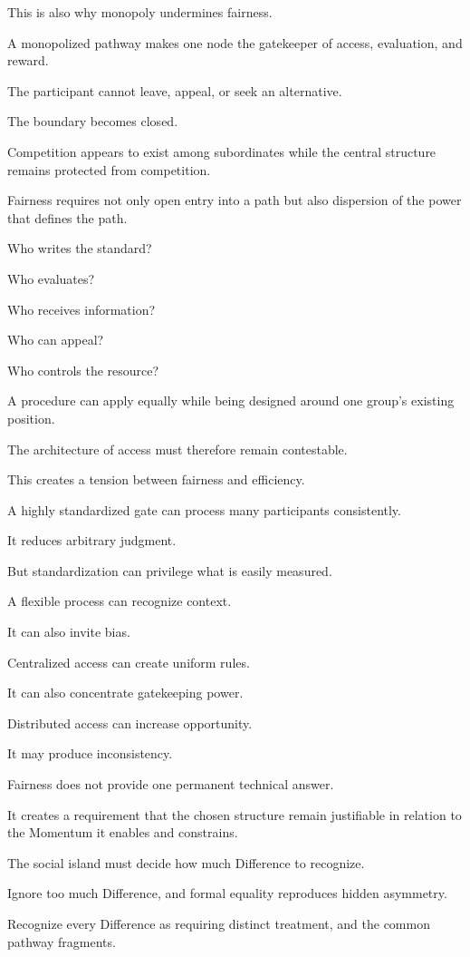 This is also why monopoly undermines fairness.

A monopolized pathway makes one node the gatekeeper of access, evaluation, and reward.

The participant cannot leave, appeal, or seek an alternative.

The boundary becomes closed.

Competition appears to exist among subordinates while the central structure remains protected from competition.

Fairness requires not only open entry into a path but also dispersion of the power that defines the path.

Who writes the standard?

Who evaluates?

Who receives information?

Who can appeal?

Who controls the resource?

A procedure can apply equally while being designed around one group’s existing position.

The architecture of access must therefore remain contestable.

This creates a tension between fairness and efficiency.

A highly standardized gate can process many participants consistently.

It reduces arbitrary judgment.

But standardization can privilege what is easily measured.

A flexible process can recognize context.

It can also invite bias.

Centralized access can create uniform rules.

It can also concentrate gatekeeping power.

Distributed access can increase opportunity.

It may produce inconsistency.

Fairness does not provide one permanent technical answer.

It creates a requirement that the chosen structure remain justifiable in relation to the Momentum it enables and constrains.

The social island must decide how much Difference to recognize.

Ignore too much Difference, and formal equality reproduces hidden asymmetry.

Recognize every Difference as requiring distinct treatment, and the common pathway fragments.

